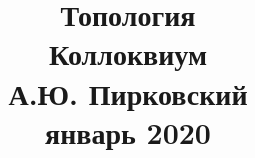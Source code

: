 \documentclass[fleqn]{article}
\title{Топология \\ Коллоквиум \\ А.Ю. Пирковский \\ январь 2020}
\begin{document}
	\maketitle
	\pagebreak
	
	
	\tableofcontents
	
	\newpage
	
			
\end{document}
